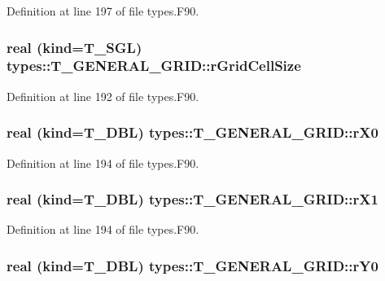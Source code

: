 Definition at line 197 of file types.F90.

\hypertarget{typetypes_1_1_t___g_e_n_e_r_a_l___g_r_i_d_ac411b2b0e3ac0e4b0b70a505bf299f31}{
\subsubsection[{rGridCellSize}]{\setlength{\rightskip}{0pt plus 5cm}real (kind={\bf T\_\-SGL}) {\bf types::T\_\-GENERAL\_\-GRID::rGridCellSize}}}
\label{typetypes_1_1_t___g_e_n_e_r_a_l___g_r_i_d_ac411b2b0e3ac0e4b0b70a505bf299f31}


Definition at line 192 of file types.F90.

\hypertarget{typetypes_1_1_t___g_e_n_e_r_a_l___g_r_i_d_a6c92e6d2f68058391652ed23d1ab68b0}{
\subsubsection[{rX0}]{\setlength{\rightskip}{0pt plus 5cm}real (kind={\bf T\_\-DBL}) {\bf types::T\_\-GENERAL\_\-GRID::rX0}}}
\label{typetypes_1_1_t___g_e_n_e_r_a_l___g_r_i_d_a6c92e6d2f68058391652ed23d1ab68b0}


Definition at line 194 of file types.F90.

\hypertarget{typetypes_1_1_t___g_e_n_e_r_a_l___g_r_i_d_a7f01e90a3c37c3e735f8ec177619dc49}{
\subsubsection[{rX1}]{\setlength{\rightskip}{0pt plus 5cm}real (kind={\bf T\_\-DBL}) {\bf types::T\_\-GENERAL\_\-GRID::rX1}}}
\label{typetypes_1_1_t___g_e_n_e_r_a_l___g_r_i_d_a7f01e90a3c37c3e735f8ec177619dc49}


Definition at line 194 of file types.F90.

\hypertarget{typetypes_1_1_t___g_e_n_e_r_a_l___g_r_i_d_aa743b65f5f84b8835d280c54fc5f6617}{
\subsubsection[{rY0}]{\setlength{\rightskip}{0pt plus 5cm}real (kind={\bf T\_\-DBL}) {\bf types::T\_\-GENERAL\_\-GRID::rY0}}}
\label{typetypes_1_1_t___g_e_n_e_r_a_l___g_r_i_d_aa743b65f5f84b8835d280c54fc5f6617}


